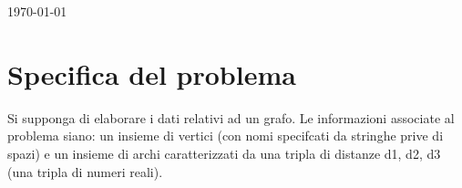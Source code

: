 \documentclass[11pt, a4paper, titlepage, block]{article}
\begin{document}
\begin{titlepage}

{\large \today}\\[10cm] %


 

\newpage

\end{titlepage}

\section{Specifica del problema}
	Si supponga di elaborare i dati relativi ad un grafo. Le informazioni associate al problema siano: un insieme di vertici (con nomi specifcati da stringhe prive di spazi) e un insieme di archi caratterizzati da una tripla di distanze d1, d2, d3 (una tripla di numeri reali).
\end{document}

